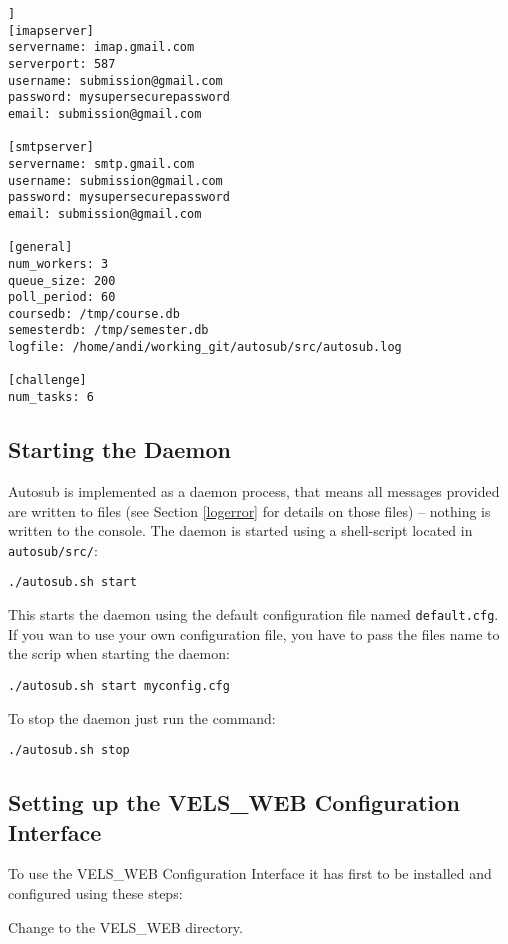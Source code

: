 \begin{lstlisting}[frame=single,captionpos=b,caption=example.cfg, belowcaptionskip=4pt]]
[imapserver]
servername: imap.gmail.com
serverport: 587
username: submission@gmail.com
password: mysupersecurepassword
email: submission@gmail.com

[smtpserver]
servername: smtp.gmail.com
username: submission@gmail.com
password: mysupersecurepassword
email: submission@gmail.com

[general]
num_workers: 3
queue_size: 200
poll_period: 60
coursedb: /tmp/course.db
semesterdb: /tmp/semester.db
logfile: /home/andi/working_git/autosub/src/autosub.log

[challenge]
num_tasks: 6
\end{lstlisting}

\subsection{Starting the Daemon}

Autosub is implemented as a daemon process, that means all messages provided are written
to files (see Section \ref{logerror} for details on those files) -- nothing is written to
the console. The daemon is started using a shell-script located in {\tt autosub/src/}:

\begin{verbatim}
./autosub.sh start
\end{verbatim}

This starts the daemon using the default configuration file named {\tt default.cfg}. If you
wan to use your own configuration file, you have to pass the files name to the scrip when
starting the daemon:

\begin{verbatim}
./autosub.sh start myconfig.cfg
\end{verbatim}

To stop the daemon just run the command:

\begin{verbatim}
./autosub.sh stop
\end{verbatim}

\subsection{Setting up the VELS\_WEB Configuration Interface}
To use the VELS\_WEB Configuration Interface it has first to be installed and
configured using these steps:

Change to the VELS\_WEB directory.

